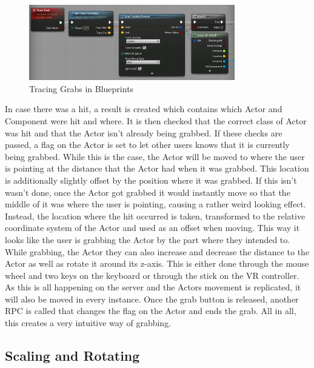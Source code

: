 \begin{figure}[htpb]
	\centering
	\includegraphics[width=0.8\textwidth]{fig/LineTracing2.png}
	\caption[Tracing Grabs in Blueprints]{Tracing Grabs in Blueprints\protect}
	\label{fig:LineTracing}
\end{figure}

In case there was a hit, a result is created which contains which Actor and Component were hit and where. It is then checked that the correct class of Actor was hit and that the Actor isn't already being grabbed. If these checks are passed, a flag on the Actor is set to let other users knows that it is currently being grabbed. While this is the case, the Actor will be moved to where the user is pointing at the distance that the Actor had when it was grabbed. This location is additionally slightly offset by the position where it was grabbed. If this isn't wasn't done, once the Actor got grabbed it would instantly move so that the middle of it was where the user is pointing, causing a rather weird looking effect. Instead, the location where the hit occurred is taken, transformed to the relative coordinate system of the Actor and used as an offset when moving. This way it looks like the user is grabbing the Actor by the part where they intended to. While grabbing, the Actor they can also increase and decrease the distance to the Actor as well as rotate it around its z-axis. This is either done through the mouse wheel and two keys on the keyboard or through the stick on the VR controller. As this is all happening on the server and the Actors movement is replicated, it will also be moved in every instance. Once the grab button is released, another \acs{RPC} is called that changes the flag on the Actor and ends the grab. All in all, this creates a very intuitive way of grabbing.

\subsection{Scaling and Rotating}

